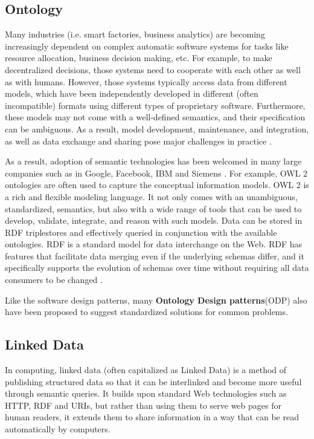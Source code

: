 \subsection{Ontology}
Many industries (i.e. smart factories, business analytics) are
becoming increasingly dependent on complex automatic software systems for tasks like resource allocation, business decision making, etc.
For example, to make decentralized decisions, those systems need to cooperate with each other as well as with humans.
However, those systems typically access data from different models, which have been independently developed in different (often incompatible) formats using different types of proprietary software. Furthermore, these models may not come with a well-defined semantics, and their specification can be ambiguous.
As a result, model development, maintenance, and integration, as well as data exchange and sharing pose major challenges in practice
\cite{CapturingIndustrialInformationWithOntologies}.

As a result, adoption of semantic technologies has been welcomed in many large companies such as in Google, Facebook, IBM \cite{SemanticTechnologiesInIBM}
and Siemens \cite{CapturingIndustrialInformationWithOntologies}.
For example, OWL 2 ontologies are often used to capture the conceptual information models.
OWL 2 is a rich and flexible modeling language. It not only comes with an
unambiguous, standardized, semantics, but also with a wide range of tools that can be used to
develop, validate, integrate, and reason with such models.
Data can be stored in RDF triplestores and effectively queried in conjunction with the available ontologies.
RDF is a standard model for data interchange on the Web.
RDF has features that facilitate data merging even if the underlying schemas differ,
and it specifically supports the evolution of schemas over time
without requiring all data consumers to be changed \cite{RDF}.

Like the software design patterns, many \textbf{Ontology Design patterns}(ODP) \cite{ODP}
also have been proposed to suggest standardized solutions for common problems.

\subsection{Linked Data}

In computing, linked data (often capitalized as Linked Data) is a method of publishing structured data so that it can be interlinked and become more useful through semantic queries. It builds upon standard Web technologies such as HTTP, RDF and URIs, but rather than using them to serve web pages for human readers, it extends them to share information in a way that can be read automatically by computers.

